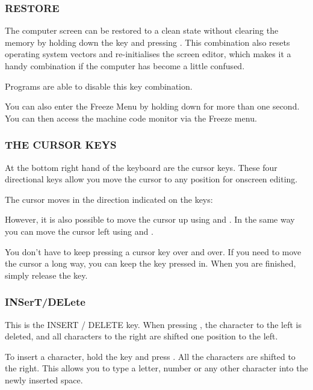 \subsubsection{RESTORE}

The computer screen can be restored to a clean state without clearing the memory by holding down the  key and pressing . This combination also resets operating system vectors and re-initialises the screen editor, which makes it a handy combination if the computer has become a little confused.

Programs are able to disable this key combination.

You can also enter the Freeze Menu by holding down  for more than one second. You can then access the machine code monitor via the Freeze menu.

\newpage

\subsubsection{THE CURSOR KEYS}

At the bottom right hand of the keyboard are the cursor keys. These four directional keys allow you move the cursor to any position for onscreen editing.

The cursor moves in the direction indicated on the keys: \megakey{$\leftarrow$} \megakey{$\uparrow$} \megakey{$\rightarrow$} \megakey{$\downarrow$}

However, it is also possible to move the cursor up using  and \megakey{$\downarrow$}. In the same way you can move the cursor left using  and \megakey{$\rightarrow$}.

You don't have to keep pressing a cursor key over and over. If you need to move the cursor a long way, you can keep the key pressed in. When you are finished, simply release the key.

\subsubsection{INSerT/DELete}

This is the INSERT / DELETE key. When pressing , the character to the left is deleted, and all characters to the right are shifted one position to the left.

To insert a character, hold the  key and press . All the characters are shifted to the right. This allows you to type a letter, number or any other character into the newly inserted space.


